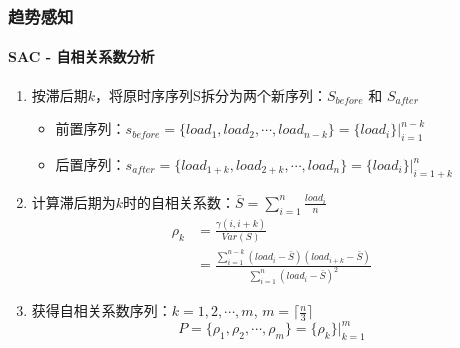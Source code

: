 \begin{frame}
\frametitle{趋势感知}
\framesubtitle{SAC - 自相关系数分析}
\begin{enumerate}[1]
    \item 按滞后期$k$，将原时序序列S拆分为两个新序列：$S_{before}$ 和 $S_{after}$
    \begin{itemize}
        \item 前置序列：$s_{before} = \{load_1,load_2,\cdots,load_{n-k}\}=\{load_i\}|^{n-k}_{i=1}$
        \item 后置序列：$s_{after} = \{load_{1+k},load_{2+k},\cdots,load_{n}\}=\{load_i\}|^{n}_{i=1+k}$
    \end{itemize}
    \item 计算滞后期为$k$时的自相关系数：$\bar{S} = \sum_{i=1}^{n} \frac{load_i}{n}$
    \begin{equation}
    \begin{aligned}
        \rho_k & =  \frac{\gamma(i,i+k)}{Var(S)} \\
               & = \frac{\sum_{i=1}^{n-k} (load_i - \bar{S})(load_{i+k} - \bar{S})}{\sum_{i=1}^{n} (load_i - \bar{S})^2}
    \end{aligned}
    \end{equation}
    \item 获得自相关系数序列：$k=1,2,\cdots,m$, $m = \lceil \frac{n}{3} \rceil$
    \begin{equation}
        P = \{\rho_1,\rho_2,\cdots,\rho_m\} = \{\rho_k\}|^m_{k=1}
    \end{equation}
\end{enumerate}
\bigskip
\end{frame}

